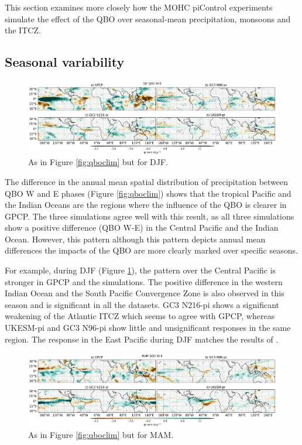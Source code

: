This section examines more closely how the MOHC piControl experiments simulate the effect of the QBO over seasonal-mean precipitation, monsoons and the ITCZ. 




\subsection{Seasonal variability}

\begin{figure}[b!]
\centering
 \includegraphics[width=\linewidth]{figures/piprdjfqbowqboe.png}
\caption[DJF mean precipitation composite difference QBO W-E ]{ As in Figure \ref{fig:qboclim} but for DJF. }
\label{fig:qbodjf}
\end{figure}

The difference in the annual mean spatial distribution of precipitation between QBO W and E phases (Figure \ref{fig:qboclim}) shows that the tropical Pacific and the Indian Oceans are the regions where the influence of the QBO is clearer in GPCP. The three simulations agree well with this result, as all three simulations show a positive difference (QBO W-E) in the Central Pacific and the Indian Ocean. However, this pattern although this pattern depicts annual mean differences the impacts of the QBO are more clearly marked over specific seasons. %

For example, during DJF (Figure \ref{fig:qbodjf}), the pattern over the Central Pacific is stronger in GPCP and the simulations. The positive difference in the western Indian Ocean and the South Pacific Convergence Zone is also observed in this season and is significant in all the datasets. GC3 N216-pi shows a significant weakening of the Atlantic ITCZ which seems to agree with GPCP, whereas UKESM-pi and GC3 N96-pi show little and unsignificant responses in the same region.
The response in the East Pacific during DJF matches the results of \cite{serva2020}.


\begin{figure}[t!]
\centering
 \includegraphics[width=\linewidth]{figures/piprmamqbowqboe.png}
\caption[MAM mean precipitation composite difference QBO W-E ]{ As in Figure \ref{fig:qboclim} but for MAM. }
\label{fig:qbomam}
\end{figure}

